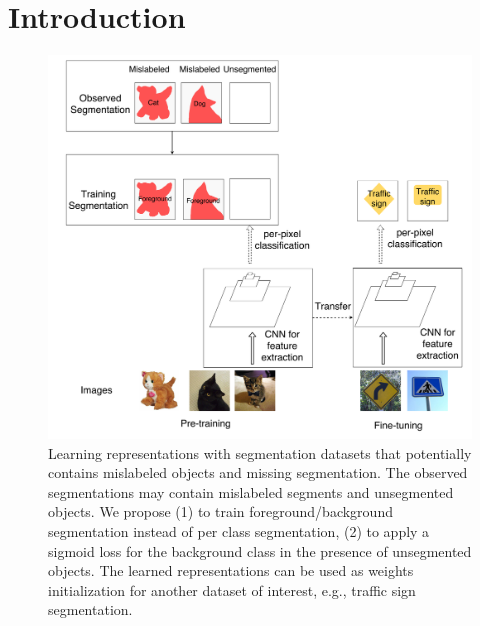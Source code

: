 \section{Introduction}
\label{introduction}




\begin{figure}[t]
\begin{center}
   \includegraphics[width=1.0\linewidth]{img/figure1}
\end{center}
   \caption{
   Learning representations with segmentation datasets that potentially contains mislabeled objects and missing segmentation.
   The observed segmentations may contain mislabeled segments and unsegmented objects.
   We propose (1) to train foreground/background segmentation instead of per class segmentation, (2) to apply a sigmoid loss for the background class in the presence of unsegmented objects.
   The learned representations can be used as weights initialization for another dataset of interest, e.g., traffic sign segmentation.
   }
\label{fig:figure1}
\end{figure}



